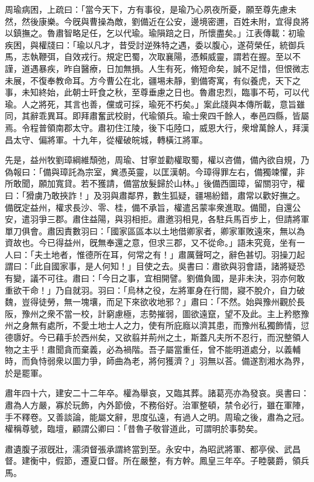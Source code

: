 \begin{pinyinscope}
周瑜病困，上疏曰：「當今天下，方有事役，是瑜乃心夙夜所憂，願至尊先慮未然，然後康樂。今旣與曹操為敵，劉備近在公安，邊境密邇，百姓未附，宜得良將以鎮撫之。魯肅智略足任，乞以代瑜。瑜隕踣之日，所懷盡矣。」江表傳載：初瑜疾困，與權牋曰：「瑜以凡才，昔受討逆殊特之遇，委以腹心，遂荷榮任，統御兵馬，志執鞭弭，自效戎行。規定巴蜀，次取襄陽，憑賴威靈，謂若在握。至以不謹，道遇暴疾，昨自醫療，日加無損。人生有死，脩短命矣，誠不足惜，但恨微志未展，不復奉教命耳。方今曹公在北，疆埸未靜，劉備寄寓，有似養虎，天下之事，未知終始，此朝士旰食之秋，至尊垂慮之日也。魯肅忠烈，臨事不苟，可以代瑜。人之將死，其言也善，儻或可採，瑜死不朽矣。」案此牋與本傳所載，意旨雖同，其辭乖異耳。即拜肅奮武校尉，代瑜領兵。瑜士衆四千餘人，奉邑四縣，皆屬焉。令程普領南郡太守。肅初住江陵，後下屯陸口，威恩大行，衆增萬餘人，拜漢昌太守、偏將軍。十九年，從權破皖城，轉橫江將軍。

先是，益州牧劉璋綱維頹弛，周瑜、甘寧並勸權取蜀，權以咨備，備內欲自規，乃偽報曰：「備與璋託為宗室，兾憑英靈，以匡漢朝。今璋得罪左右，備獨竦懼，非所敢聞，願加寬貸。若不獲請，備當放髮歸於山林。」後備西圖璋，留關羽守，權曰：「猾虜乃敢挾詐！」及羽與肅鄰界，數生狐疑，疆埸紛錯，肅常以歡好撫之。備旣定益州，權求長沙、零、桂，備不承旨，權遣呂蒙率衆進取。備聞，自還公安，遣羽爭三郡。肅住益陽，與羽相拒。肅邀羽相見，各駐兵馬百步上，但請將軍單刀俱會。肅因責數羽曰：「國家區區本以土地借卿家者，卿家軍敗遠來，無以為資故也。今已得益州，旣無奉還之意，但求三郡，又不從命。」語未究竟，坐有一人曰：「夫土地者，惟德所在耳，何常之有！」肅厲聲呵之，辭色甚切。羽操刀起謂曰：「此自國家事，是人何知！」目使之去。吳書曰：肅欲與羽會語，諸將疑恐有變，議不可往。肅曰：「今日之事，宜相開譬。劉備負國，是非未決，羽亦何敢重欲干命！」乃自就羽。羽曰：「烏林之役，左將軍身在行間，寢不脫介，自力破魏，豈得徒勞，無一塊壤，而足下來欲收地邪？」肅曰：「不然。始與豫州觀於長阪，豫州之衆不當一校，計窮慮極，志勢摧弱，圖欲遠竄，望不及此。主上矜愍豫州之身無有處所，不愛土地士人之力，使有所庇廕以濟其患，而豫州私獨飾情，愆德隳好。今已藉手於西州矣，又欲翦并荊州之土，斯蓋凡夫所不忍行，而況整領人物之主乎！肅聞貪而棄義，必為禍階。吾子屬當重任，曾不能明道處分，以義輔時，而負恃弱衆以圖力爭，師曲為老，將何獲濟？」羽無以荅。備遂割湘水為界，於是罷軍。

肅年四十六，建安二十二年卒。權為舉哀，又臨其葬。諸葛亮亦為發哀。吳書曰：肅為人方嚴，寡於玩飾，內外節儉，不務俗好。治軍整頓，禁令必行，雖在軍陣，手不釋卷。又善談論，能屬文辭，思度弘遠，有過人之明。周瑜之後，肅為之冠。權稱尊號，臨壇，顧謂公卿曰：「昔魯子敬甞道此，可謂明於事勢矣。

肅遺腹子淑旣壯，濡須督張承謂終當到至。永安中，為昭武將軍、都亭侯、武昌督。建衡中，假節，遷夏口督。所在嚴整，有方幹。鳳皇三年卒。子睦襲爵，領兵馬。


\end{pinyinscope}